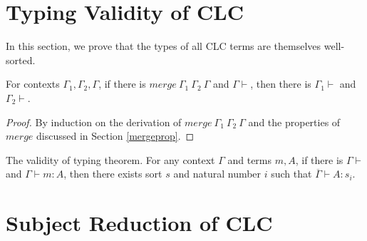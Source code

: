\documentclass[sigplan,screen,review,anonymous]{acmart}
\newcommand{\mrg}[3]{merge\ {#1}\ {#2}\ {#3}}
\begin{document}
\section{Typing Validity of CLC}

In this section, we prove that the types of all CLC terms are themselves well-sorted.

\begin{lemma}\label{mergecontextokinv}
  For contexts $\Gamma_1, \Gamma_2, \Gamma$, if there is $\mrg{\Gamma_1}{\Gamma_2}{\Gamma}$ and $\Gamma \vdash$, then there is $\Gamma_1 \vdash$ and $\Gamma_2 \vdash$.
\end{lemma}
\begin{proof}
  By induction on the derivation of $\mrg{\Gamma_1}{\Gamma_2}{\Gamma}$ and the properties of $merge$ discussed in Section \ref{mergeprop}.
\end{proof}

\begin{theorem}\label{valid}
  The validity of typing theorem. For any context $\Gamma$ and terms $m, A$, if there is $\Gamma \vdash$ and $\Gamma \vdash m : A$, then there exists sort $s$ and natural number $i$ such that $\overline{\Gamma} \vdash A : s_i$.
\end{theorem}

\section{Subject Reduction of CLC}
\end{document}

